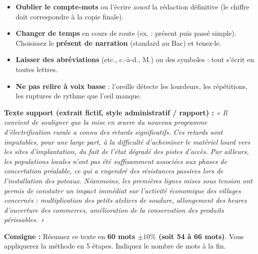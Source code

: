\documentclass[11pt]{article}
\newcounter{popsec}
\newcounter{popsub}
\newcommand{\courssub}[1]{%
  \stepcounter{popsub}%
  \par\vspace{9pt}\noindent{\popxbold\fontsize{11.5}{13}\selectfont\color{popink}{\color{poporange}\thepopsec.\thepopsub}\hspace{6pt}#1}\par\nopagebreak\vspace{4pt}
}
\begin{document}
\begin{attention}
\begin{itemize}
    \item \textbf{Oublier le compte-mots} ou l'écrire \emph{avant} la rédaction définitive (le chiffre doit correspondre à la copie finale).
    \item \textbf{Changer de temps} en cours de route (ex. : présent puis passé simple). Choisissez le \textbf{présent de narration} (standard au Bac) et tenez-le.
    \item \textbf{Laisser des abréviations} (etc., c.-à-d., M.) ou des symboles : tout s'écrit en toutes lettres.
    \item \textbf{Ne pas relire à voix basse} : l'oreille détecte les lourdeurs, les répétitions, les ruptures de rythme que l'œil manque.
\end{itemize}
\end{attention}

\courssub{Exercice d'entraînement}

\begin{exercice}
\textbf{Texte support (extrait fictif, style administratif / rapport) :}
\textit{« Il convient de souligner que la mise en œuvre du nouveau programme d'électrification rurale a connu des retards significatifs. Ces retards sont imputables, pour une large part, à la difficulté d'acheminer le matériel lourd vers les sites d'implantation, du fait de l'état dégradé des pistes d'accès. Par ailleurs, les populations locales n'ont pas été suffisamment associées aux phases de concertation préalable, ce qui a engendré des résistances passives lors de l'installation des poteaux. Néanmoins, les premières lignes mises sous tension ont permis de constater un impact immédiat sur l'activité économique des villages concernés : multiplication des petits ateliers de soudure, allongement des heures d'ouverture des commerces, amélioration de la conservation des produits périssables. »}

\textbf{Consigne :} Résumez ce texte en \textbf{60 mots $\pm 10\%$ (soit 54 à 66 mots)}. Vous appliquerez la méthode en 5 étapes. Indiquez le nombre de mots à la fin.
\end{exercice}
\end{document}
